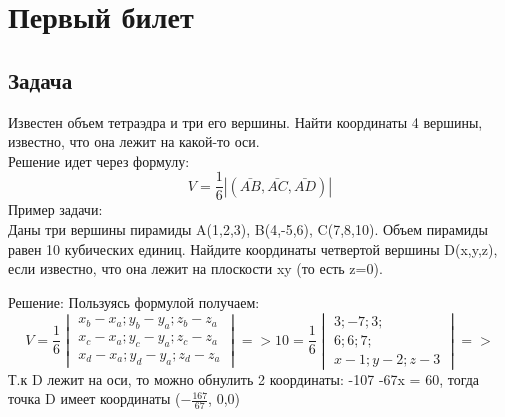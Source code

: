 \documentclass[a4paper,14pt]{extreport} %
\begin{document}
\chapter{Первый билет}
\section*{Задача}
Известен объем тетраэдра и три его вершины. Найти координаты 4 вершины, 
известно, что она лежит на какой-то оси. \\ 
Решение идет через формулу:
\[
  V = \frac{1}{6}|(\bar{AB}, \bar{AC}, \bar{AD})|
\]
Пример задачи: \\
Даны три вершины пирамиды A(1,2,3), B(4,-5,6), C(7,8,10). Объем пирамиды равен 10 кубических единиц.
Найдите координаты четвертой вершины D(x,y,z), если известно, что она лежит на плоскости xy (то есть z=0).

Решение:
Пользуясь формулой получаем:
\[
  V = \frac{1}{6} \begin{vmatrix}
    x_b - x_a; y_b - y_a; z_b -z_a \\
    x_c - x_a; y_c - y_a; z_c -z_a\\
    x_d - x_a; y_d - y_a; z_d -z_a
  \end{vmatrix} => 10 = \frac{1}{6} \begin{vmatrix}
    3 ; -7 ; 3 ; \\
    6;   6;  7;\\ 
    x-1;y-2;z-3
  \end{vmatrix} =>
\]
Т.к D лежит на оси, то можно обнулить 2 координаты:  -107 -67x = 60, тогда 
точка D имеет координаты ($ -\frac{167}{67} $, 0,0) \\ 
\end{document}
